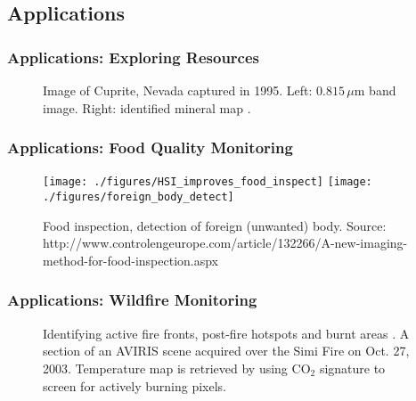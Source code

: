 \documentclass[10pt,mathserif]{beamer}
\begin{document}
\subsection{Applications}
    \begin{frame}
        \frametitle{Applications: Exploring Resources}
        \begin{figure}
            \caption{Image of Cuprite, Nevada captured in 1995.\newline
                     Left: $0.815\,\mu$m band image. Right: identified mineral map
                     \cite{COMP_AVIRIS_HYPERION_FOR_HSI_MINERAL_MAPPING,AVIRIS}.}
        \end{figure}
    \end{frame}
    \begin{frame}
        \frametitle{Applications: Food Quality Monitoring}
        \begin{figure}
            \texttt{[image: ./figures/HSI\_improves\_food\_inspect]}
            \texttt{[image: ./figures/foreign\_body\_detect]}
            \caption{Food inspection, detection of foreign (unwanted) body.\newline
                     {\tiny Source: http://www.controlengeurope.com/article/132266/A-new-imaging-method-for-food-inspection.aspx}}
        \end{figure}
    \end{frame}
    \begin{frame}
        \frametitle{Applications: Wildfire Monitoring}
        \begin{figure}
            \caption{Identifying active fire fronts, post-fire hotspots and
                     burnt areas \cite{WILDFIRE_DETECT_FIRE_TEMP_FROM_HSI}.\newline
                     A section of an AVIRIS scene acquired over the Simi Fire
                     on Oct. 27, 2003.\newline
                     Temperature map is retrieved by using CO$_2$ signature to screen
                     for actively burning pixels.}
        \end{figure}
    \end{frame}
\end{document}
